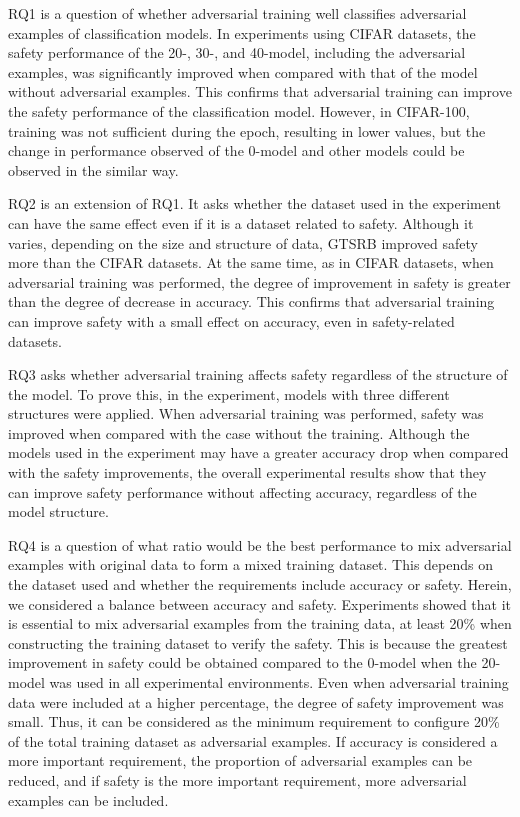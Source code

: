 \documentclass[journal,article,submit,moreauthors,pdftex]{Definitions/mdpi}
\begin{document}
RQ1 is a question of whether adversarial training well classifies adversarial examples of classification models.
In experiments using CIFAR datasets, the safety performance of the 20-, 30-, and 40-model, including the adversarial examples, was significantly improved when compared with that of the model without adversarial examples.
This confirms that adversarial training can improve the safety performance of the classification model.
However, in CIFAR-100, training was not sufficient during the epoch, resulting in lower values, but the change in performance observed of the 0-model and other models could be observed in the similar way.

RQ2 is an extension of RQ1. It asks whether the dataset used in the experiment can have the same effect even if it is a dataset related to safety.
Although it varies, depending on the size and structure of data, GTSRB improved safety more than the CIFAR datasets.
At the same time, as in CIFAR datasets, when adversarial training was performed, the degree of improvement in safety is greater than the degree of decrease in accuracy.
This confirms that adversarial training can improve safety with a small effect on accuracy, even in safety-related datasets.

RQ3 asks whether adversarial training affects safety regardless of the structure of the model.
To prove this, in the experiment, models with three different structures were applied.
When adversarial training was performed, safety was improved when compared with the case without the training.
Although the models used in the experiment may have a greater accuracy drop when compared with the safety improvements, the overall experimental results show that they can improve safety performance without affecting accuracy, regardless of the model structure.

RQ4 is a question of what ratio would be the best performance to mix adversarial examples with original data to form a mixed training dataset.
This depends on the dataset used and whether the requirements include accuracy or safety. Herein, we considered a balance between accuracy and safety.
Experiments showed that it is essential to mix adversarial examples from the training data, at least 20\% when constructing the training dataset to verify the safety.
This is because the greatest improvement in safety could be obtained compared to the 0-model when the 20-model was used in all experimental environments.
Even when adversarial training data were included at a higher percentage, the degree of safety improvement was small. Thus, it can be considered as the minimum requirement to configure 20\% of the total training dataset as adversarial examples.
If accuracy is considered a more important requirement, the proportion of adversarial examples can be reduced, and if safety is the more important requirement, more adversarial examples can be included.
\end{document}
